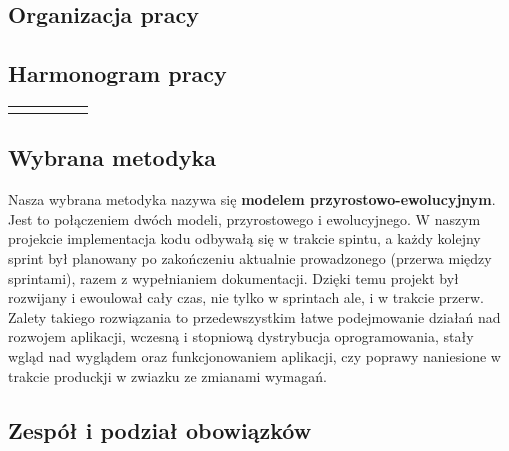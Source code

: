 \begin{chap5}
    \chapter{Organizacja pracy}

    \section{Harmonogram pracy}

    \begin{table}[htbp]
        \centering
        \begin{tabular}{|P{2.3cm}|P{2.3cm}|P{2.3cm}|P{2.3cm}|P{2.3cm}|}
        \end{tabular}
    \end{table}

    \section{Wybrana metodyka}

    \par Nasza wybrana metodyka nazywa się \textbf{modelem przyrostowo-ewolucyjnym}.
    Jest to połączeniem dwóch modeli, przyrostowego i ewolucyjnego.
    W naszym projekcie implementacja kodu odbywałą się w trakcie spintu, a każdy kolejny sprint był planowany po
    zakończeniu aktualnie prowadzonego (przerwa między sprintami), razem z wypełnianiem dokumentacji.
    Dzięki temu projekt był rozwijany i ewoulował cały czas, nie tylko w sprintach ale, i w trakcie przerw.
    Zalety takiego rozwiązania to przedewszystkim łatwe podejmowanie działań nad rozwojem aplikacji,
    wczesną i stopniową dystrybucja oprogramowania, stały wgląd nad wyglądem oraz funkcjonowaniem aplikacji,
    czy poprawy naniesione w trakcie produckji w zwiazku ze zmianami wymagań.

    \section{Zespół i podział obowiązków}
    \centering


\end{chap5}
